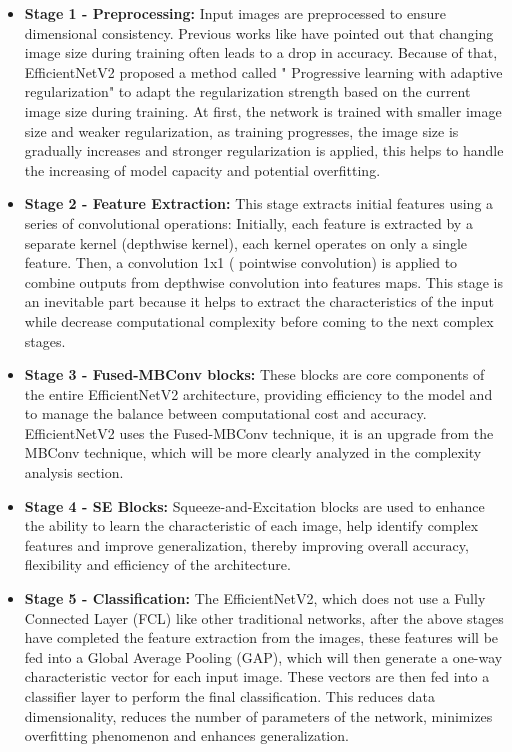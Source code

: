\documentclass[conference]{IEEEtran}
\begin{document}
\begin{itemize}
    \item \textbf{Stage 1 - Preprocessing:}
        Input images are preprocessed to ensure dimensional consistency. Previous works like \cite{howard2018training,hoffer2019mix} have pointed out that changing image size during training often leads to a drop in accuracy. Because of that, EfficientNetV2 proposed a method called " Progressive learning with adaptive regularization" to adapt the regularization strength based on the current image size during training. At first, the network is trained with smaller image size and weaker regularization, as training progresses, the image size is gradually increases and stronger regularization is applied, this helps to handle the increasing of model capacity and potential overfitting.
    \item \textbf{Stage 2 - Feature Extraction:} This stage extracts initial features using a series of convolutional operations: Initially, each feature is extracted by a separate kernel (depthwise kernel), each kernel operates on only a single feature. Then, a convolution 1x1 ( pointwise convolution) is applied to combine outputs from depthwise convolution into features maps. This stage is an inevitable part because it helps to extract the characteristics of the input while decrease computational complexity before coming to the next complex stages.
    \item \textbf{Stage 3 - Fused-MBConv blocks:} 
    These blocks are core components of the entire EfficientNetV2 architecture, providing efficiency to the model and to manage the balance between computational cost and accuracy. EfficientNetV2 uses the Fused-MBConv technique, it is an upgrade from the MBConv technique, which will be more clearly analyzed in the complexity analysis section.
    \item \textbf{Stage 4 - SE Blocks:} 
    Squeeze-and-Excitation blocks are used to enhance the ability to learn the characteristic of each image, help identify complex features and improve generalization, thereby improving overall accuracy, flexibility and efficiency of the architecture.
    \item \textbf{Stage 5 - Classification:} 
    The EfficientNetV2, which does not use a Fully Connected Layer (FCL) like other traditional networks, after the above stages have completed the feature extraction from the images, these features will be fed into a Global Average Pooling (GAP), which will then generate a one-way characteristic vector for each input image. These vectors are then fed into a classifier layer to perform the final classification. This reduces data dimensionality, reduces the number of parameters of the network, minimizes overfitting phenomenon and enhances generalization.
\end{itemize}
\end{document}
